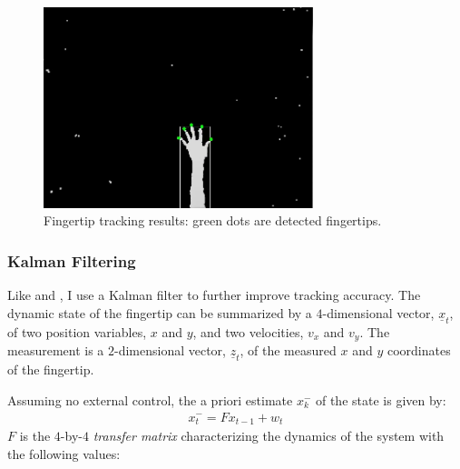 \begin{figure}[tbh]
\centering
\includegraphics[width=0.7\textwidth]{figures/five_fingers.PNG}
\caption{Fingertip tracking results: green dots are detected fingertips.}
\label{fig:five-finger}
\end{figure}

\subsubsection{Kalman Filtering}
Like \cite{Oka02} and \cite{harrison11}, I use a Kalman filter to further
improve tracking accuracy. The dynamic state
of the fingertip can be summarized by a $4$-dimensional vector,
$\underline{x}_t$, of two position variables, $x$ and $y$, and two velocities,
$v_x$ and $v_y$. The measurement is a $2$-dimensional vector, $\underline{z}_t$,
of the measured $x$ and $y$ coordinates of the fingertip.

Assuming no external control, the a priori estimate $x_k^-$ of the state is
given by:
\begin{align*}
x_t^- = Fx_{t - 1} + w_t
\end{align*}
$F$ is the $4$-by-$4$ \textit{transfer matrix} characterizing the
dynamics of the system with the following values:

